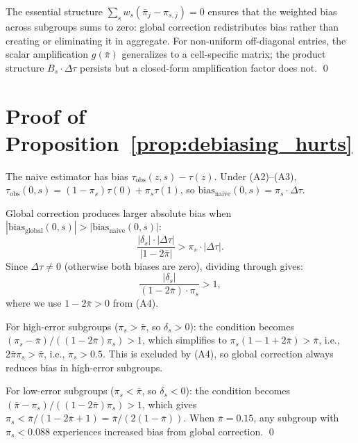 The essential structure $\sum_s w_s (\bar{\pi}_j - \pi_{s,j}) = 0$ ensures that the weighted bias across subgroups sums to zero: global correction redistributes bias rather than creating or eliminating it in aggregate.
For non-uniform off-diagonal entries, the scalar amplification $g(\bar{\pi})$ generalizes to a cell-specific matrix; the product structure $B_s \cdot \Delta\tau$ persists but a closed-form amplification factor does not. \qed

\section{Proof of Proposition~\ref{prop:debiasing_hurts}}
\label{app:debiasing_hurts}

The naive estimator has bias $\tau_{\text{obs}}(z,s) - \tau(z)$.
Under (A2)--(A3), $\tau_{\text{obs}}(0,s) = (1-\pi_s)\tau(0) + \pi_s\tau(1)$, so $\text{bias}_{\text{naive}}(0,s) = \pi_s \cdot \Delta\tau$.

Global correction produces larger absolute bias when $|\text{bias}_{\text{global}}(0,s)| > |\text{bias}_{\text{naive}}(0,s)|$:
\begin{equation}
\frac{|\delta_s| \cdot |\Delta\tau|}{|1-2\bar{\pi}|} > \pi_s \cdot |\Delta\tau|.
\end{equation}
Since $\Delta\tau \neq 0$ (otherwise both biases are zero), dividing through gives:
\begin{equation}
\frac{|\delta_s|}{(1-2\bar{\pi}) \cdot \pi_s} > 1,
\end{equation}
where we use $1-2\bar{\pi} > 0$ from (A4).

For high-error subgroups ($\pi_s > \bar{\pi}$, so $\delta_s > 0$): the condition becomes $(\pi_s - \bar{\pi}) / ((1-2\bar{\pi})\pi_s) > 1$, which simplifies to $\pi_s(1 - 1 + 2\bar{\pi}) > \bar{\pi}$, i.e., $2\bar{\pi}\pi_s > \bar{\pi}$, i.e., $\pi_s > 0.5$.
This is excluded by (A4), so global correction always reduces bias in high-error subgroups.

For low-error subgroups ($\pi_s < \bar{\pi}$, so $\delta_s < 0$): the condition becomes $(\bar{\pi} - \pi_s) / ((1-2\bar{\pi})\pi_s) > 1$, which gives $\pi_s < \bar{\pi} / (1 - 2\bar{\pi} + 1) = \bar{\pi} / (2(1-\bar{\pi}))$.
When $\bar{\pi} = 0.15$, any subgroup with $\pi_s < 0.088$ experiences increased bias from global correction. \qed

